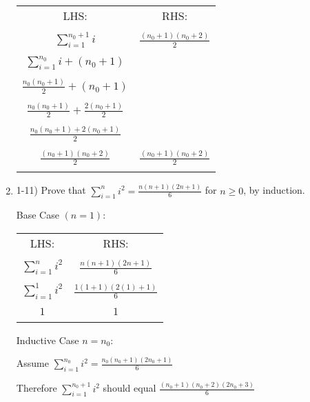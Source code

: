\documentclass{article}
\begin{document}
\begin{enumerate}
    \begin{center}
        \begin{tabular}{ c | c } 
        LHS: & RHS: \\ \\
        $ \sum_{i=1}^{n_0+1} i $ & $ \frac{(n_0+1)(n_0+2)}{2} $ \\ \\
        $ \sum_{i=1}^{n_0} i + (n_0+1) $ & \\ \\
        $ \frac{n_0(n_0+1)}{2} + (n_0+1) $ & \\ \\
        $ \frac{n_0(n_0+1)}{2} + \frac{2(n_0+1)}{2} $ & \\ \\
        $ \frac{n_0(n_0+1)+2(n_0+1)}{2} $ & \\ \\
        $ \boxed{\frac{(n_0+1)(n_0+2)}{2}} $ & $ \boxed{\frac{(n_0+1)(n_0+2)}{2}} $\\ \\
        \end{tabular}
    \end{center}
    \item 1-11) Prove that $\sum_{i=1}^{n}i^2=\frac{n(n+1)(2n+1)}{6} $ for $n \ge 0 $, by induction.
    
    Base Case $(n = 1)$:
    \begin{center}
        \begin{tabular}{ c | c } 
        LHS: & RHS: \\ & \\
        $ \sum_{i=1}^{n}i^2 $ & $ \frac{n(n+1)(2n+1)}{6}$ \\ \\
        $ \sum_{i=1}^{1}i^2 $ & $ \frac{1(1+1)(2(1)+1)}{6}$ \\ \\
        $ 1 $ & $ 1 $ \\ \\
        \end{tabular}
    \end{center}
    Inductive Case $ n = n_0 $:
    
        Assume $ \sum_{i=1}^{n_0} i^2 = \frac{n_0(n_0+1)(2n_0+1)}{6} $

        Therefore $ \sum_{i=1}^{n_0+1} i^2 $ should equal $ \frac{(n_0+1)(n_0+2)(2n_0+3)}{6} $


\end{enumerate}
\end{document}
